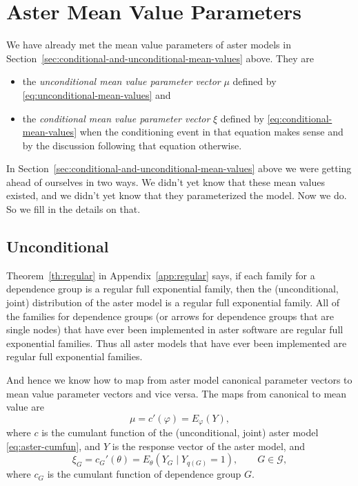 \section{Aster Mean Value Parameters}

We have already met the mean value parameters of aster models in
Section~\ref{sec:conditional-and-unconditional-mean-values} above.
They are
\begin{itemize}
\item the \emph{unconditional mean value parameter vector} $\mu$ defined by
\eqref{eq:unconditional-mean-values} and
\item the \emph{conditional mean value parameter vector} $\xi$ defined by
\eqref{eq:conditional-mean-values} when the conditioning event in that
equation makes sense and by the discussion following that equation otherwise.
\end{itemize}

In Section~\ref{sec:conditional-and-unconditional-mean-values} above
we were getting ahead of ourselves in two ways.  We didn't yet know
that these mean values existed, and we didn't yet know that they
parameterized the model.  Now we do.  So we fill in the details on that.

\subsection{Unconditional}

Theorem~\ref{th:regular} in Appendix~\ref{app:regular} says, if each
family for a dependence group is a regular full exponential family,
then the (unconditional, joint) distribution of the aster model is
a regular full exponential family.  All of the families for dependence
groups (or arrows for dependence groups that are single nodes) that
have ever been implemented in aster software are regular full exponential
families.
Thus all aster models that have ever been implemented are
regular full exponential families.

And hence we know how to map from aster model canonical parameter vectors
to mean value parameter vectors and vice versa.  The maps from canonical
to mean value are
\begin{equation} \label{eq:aster-phi-to-mu}
   \mu = c'(\varphi) = E_\varphi(Y),
\end{equation}
where $c$ is the cumulant function of the (unconditional, joint) aster
model \eqref{eq:aster-cumfun}, and $Y$ is the response vector of the
aster model, and
\begin{equation} \label{eq:aster-theta-to-xi}
   \xi_G = c_G'(\theta) = E_\theta(Y_G \mid Y_{q(G)} = 1),
   \qquad G \in \mathcal{G},
\end{equation}
where $c_G$ is the cumulant function of dependence group $G$.

